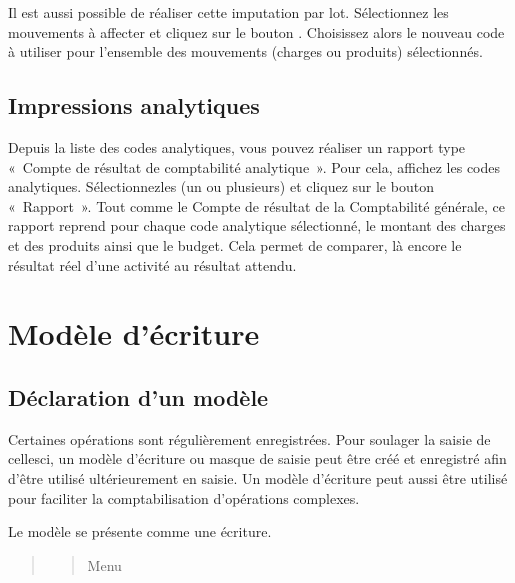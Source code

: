 \documentclass[a4paper,10pt,oneside,french]{sphinxmanual}
\begin{document}
Il est aussi possible de réaliser cette imputation par lot.
Sélectionnez les mouvements à affecter et cliquez sur le bouton . Choisissez alors le nouveau code à utiliser
pour l’ensemble des mouvements (charges ou  produits) sélectionnés.


\subsection{Impressions analytiques}
\label{\detokenize{accounting/costaccounting:impressions-analytiques}}
Depuis la liste des codes analytiques, vous pouvez réaliser un rapport type « Compte de résultat de comptabilité analytique ».
Pour cela, affichez les codes analytiques. Sélectionnez\sphinxhyphen{}les (un ou plusieurs) et cliquez sur le bouton « Rapport ».
Tout comme le Compte de résultat de la Comptabilité générale, ce rapport reprend pour chaque code analytique sélectionné, le montant des charges et des produits ainsi que le budget. Cela permet de comparer, là encore le résultat réel d’une activité au résultat attendu.


\section{Modèle d’écriture}
\label{\detokenize{accounting/model:modele-d-ecriture}}\label{\detokenize{accounting/model::doc}}

\subsection{Déclaration d’un modèle}
\label{\detokenize{accounting/model:declaration-d-un-modele}}
Certaines opérations sont régulièrement enregistrées. Pour soulager la saisie de celles\sphinxhyphen{}ci, un modèle d’écriture ou masque de saisie peut être créé et enregistré afin d’être utilisé ultérieurement en saisie.
Un modèle d’écriture peut aussi être utilisé pour faciliter la comptabilisation d’opérations complexes.

Le modèle se présente comme une écriture.
\begin{quote}
\begin{quote}

Menu 
\end{quote}

\noindent{}
\end{quote}
\end{document}
